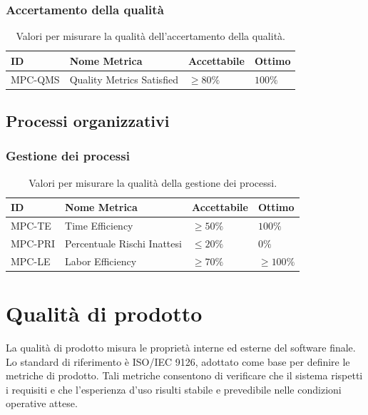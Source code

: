 \documentclass[a4paper,12pt]{article}
\begin{document}
\subsubsection{Accertamento della qualità}
\begin{table}[H]
    \centering
    \renewcommand{\arraystretch}{1.2}
    \begin{tabularx}{\textwidth}{|p{2.4cm}|X|p{3cm}|p{3cm}|}
        \hline
        \rowcolor{gray!20}
        \textbf{ID} & \textbf{Nome Metrica} & \textbf{Accettabile} & \textbf{Ottimo} \\
        \hline
        MPC-QMS & Quality Metrics Satisfied & $\geq 80\%$ & $100\%$ \\
        \hline
    \end{tabularx}
    \caption{Valori per misurare la qualità dell'accertamento della qualità.}
\end{table}

\subsection{Processi organizzativi}
\subsubsection{Gestione dei processi}
\begin{table}[H]
    \centering
    \renewcommand{\arraystretch}{1.2}
    \begin{tabularx}{\textwidth}{|p{2.4cm}|X|p{3cm}|p{3cm}|}
        \hline
        \rowcolor{gray!20}
        \textbf{ID} & \textbf{Nome Metrica} & \textbf{Accettabile} & \textbf{Ottimo} \\
        \hline
        MPC-TE & Time Efficiency & $\geq 50\%$ & $100\%$ \\
        MPC-PRI & Percentuale Rischi Inattesi & $\leq 20\%$ & $0\%$ \\
        MPC-LE & Labor Efficiency & $\geq 70\%$ & $\geq 100\%$ \\
        \hline
    \end{tabularx}
    \caption{Valori per misurare la qualità della gestione dei processi.}
\end{table}

\section{Qualità di prodotto}
La qualità di prodotto misura le proprietà interne ed esterne del software finale. Lo standard di riferimento è ISO/IEC 9126, adottato come base per definire le metriche di prodotto.
Tali metriche consentono di verificare che il sistema rispetti i requisiti e che l'esperienza d'uso risulti stabile e prevedibile nelle condizioni operative attese.
\end{document}
